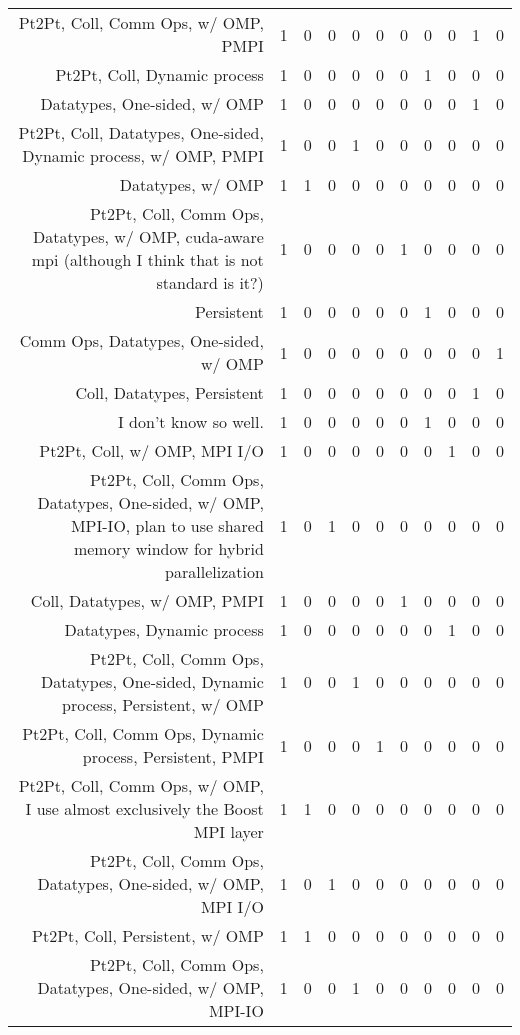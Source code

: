 {\begin{landscape}
\begin{longtable}[htb]{r|c|c|c|c|c|c|c|c|c|c}
{Pt2Pt, Coll, Comm Ops, w/ OMP, PMPI} & 1 & 0 & 0 & 0 & 0 & 0 & 0 & 0 & 1 & 0 \\%
{Pt2Pt, Coll, Dynamic process} & 1 & 0 & 0 & 0 & 0 & 0 & 1 & 0 & 0 & 0 \\%
{Datatypes, One-sided, w/ OMP} & 1 & 0 & 0 & 0 & 0 & 0 & 0 & 0 & 1 & 0 \\%
{Pt2Pt, Coll, Datatypes, One-sided, Dynamic process, w/ OMP, PMPI} & 1 & 0 & 0 & 1 & 0 & 0 & 0 & 0 & 0 & 0 \\%
{Datatypes, w/ OMP} & 1 & 1 & 0 & 0 & 0 & 0 & 0 & 0 & 0 & 0 \\%
{Pt2Pt, Coll, Comm Ops, Datatypes, w/ OMP, cuda-aware mpi (although I think that is not standard is it?)} & 1 & 0 & 0 & 0 & 0 & 1 & 0 & 0 & 0 & 0 \\%
{Persistent} & 1 & 0 & 0 & 0 & 0 & 0 & 1 & 0 & 0 & 0 \\%
{Comm Ops, Datatypes, One-sided, w/ OMP} & 1 & 0 & 0 & 0 & 0 & 0 & 0 & 0 & 0 & 1 \\%
{Coll, Datatypes, Persistent} & 1 & 0 & 0 & 0 & 0 & 0 & 0 & 0 & 1 & 0 \\%
{I don't know so well.} & 1 & 0 & 0 & 0 & 0 & 0 & 1 & 0 & 0 & 0 \\%
{Pt2Pt, Coll, w/ OMP, MPI I/O} & 1 & 0 & 0 & 0 & 0 & 0 & 0 & 1 & 0 & 0 \\%
{Pt2Pt, Coll, Comm Ops, Datatypes, One-sided, w/ OMP, MPI-IO, plan to use shared memory window for hybrid parallelization} & 1 & 0 & 1 & 0 & 0 & 0 & 0 & 0 & 0 & 0 \\%
{Coll, Datatypes, w/ OMP, PMPI} & 1 & 0 & 0 & 0 & 0 & 1 & 0 & 0 & 0 & 0 \\%
{Datatypes, Dynamic process} & 1 & 0 & 0 & 0 & 0 & 0 & 0 & 1 & 0 & 0 \\%
{Pt2Pt, Coll, Comm Ops, Datatypes, One-sided, Dynamic process, Persistent, w/ OMP} & 1 & 0 & 0 & 1 & 0 & 0 & 0 & 0 & 0 & 0 \\%
{Pt2Pt, Coll, Comm Ops, Dynamic process, Persistent, PMPI} & 1 & 0 & 0 & 0 & 1 & 0 & 0 & 0 & 0 & 0 \\%
{Pt2Pt, Coll, Comm Ops, w/ OMP, I use almost exclusively the Boost MPI layer} & 1 & 1 & 0 & 0 & 0 & 0 & 0 & 0 & 0 & 0 \\%
{Pt2Pt, Coll, Comm Ops, Datatypes, One-sided, w/ OMP, MPI I/O} & 1 & 0 & 1 & 0 & 0 & 0 & 0 & 0 & 0 & 0 \\%
{Pt2Pt, Coll, Persistent, w/ OMP} & 1 & 1 & 0 & 0 & 0 & 0 & 0 & 0 & 0 & 0 \\%
{Pt2Pt, Coll, Comm Ops, Datatypes, One-sided, w/ OMP, MPI-IO} & 1 & 0 & 0 & 1 & 0 & 0 & 0 & 0 & 0 & 0 \\%

\end{longtable}
\end{landscape}}
